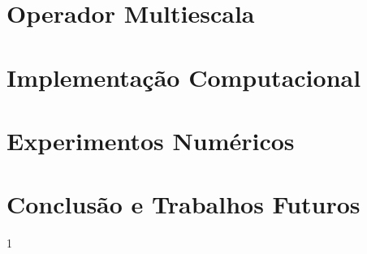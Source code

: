 \documentclass[msc,numbers]{coppe}
\def\realreservoir{0}
\begin{document}
  \chapter{Operador Multiescala}\label{ch:multiescala}
  

  \chapter{Implementação Computacional}\label{ch:implementacao}
  
  
  \chapter{Experimentos Numéricos} \label{ch:resultados}
  

  \chapter{Conclusão e Trabalhos Futuros}
  
  
  \backmatter
  
  

  \appendix
  
  
\if\realreservoir1
  
\fi


  
  
\end{document}
